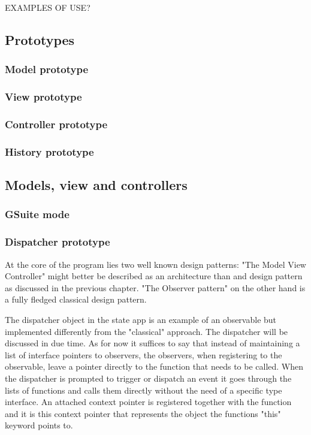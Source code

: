 \documentclass[english]{ifimaster}
\begin{document}
EXAMPLES OF USE?

\subsection{Prototypes}
\subsubsection{Model prototype}
\subsubsection{View prototype}
\subsubsection{Controller prototype}
\subsubsection{History prototype}

\subsection{Models, view and controllers} 

\subsubsection{GSuite mode}





\subsubsection{Dispatcher prototype}
At the core of the program lies two well known design patterns: "The Model View Controller" might better be described as an architecture than and design pattern as discussed in the previous chapter. "The Observer pattern" on the other hand is a fully fledged classical design pattern.

The dispatcher object in the state app is an example of an observable but implemented differently from the "classical" approach. The dispatcher will be discussed in due time. As for now it suffices to say that instead of maintaining a list of interface pointers to observers, the observers, when registering to the observable, leave a pointer directly to the function that needs to be called. When the dispatcher is prompted to trigger or dispatch an event it goes through the lists of functions and calls them directly without the need of a specific type interface. An attached context pointer is registered together with the function and it is this context pointer that represents the object the functions "this" keyword points to.
\end{document}
